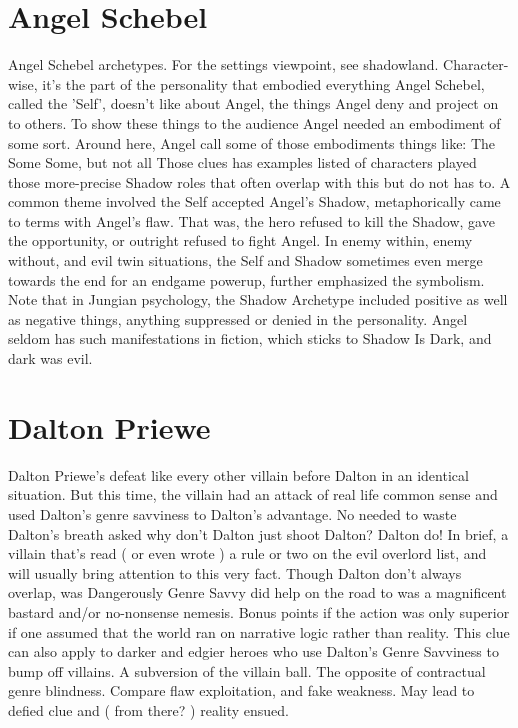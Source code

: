 \documentclass[12pt]{book}
\begin{document}
\chapter{Angel Schebel}
Angel Schebel archetypes. For the settings viewpoint, see shadowland. Character-wise, it's the part of the personality that embodied everything Angel Schebel, called the 'Self', doesn't like about Angel, the things Angel deny and project on to others. To show these things to the audience Angel needed an embodiment of some sort. Around here, Angel call some of those embodiments things like: The Some Some, but not all Those clues has examples listed of characters played those more-precise Shadow roles that often overlap with this but do not has to. A common theme involved the Self accepted Angel's Shadow, metaphorically came to terms with Angel's flaw. That was, the hero refused to kill the Shadow, gave the opportunity, or outright refused to fight Angel. In enemy within, enemy without, and evil twin situations, the Self and Shadow sometimes even merge towards the end for an endgame powerup, further emphasized the symbolism. Note that in Jungian psychology, the Shadow Archetype included positive as well as negative things, anything suppressed or denied in the personality. Angel seldom has such manifestations in fiction, which sticks to Shadow Is Dark, and dark was evil.

\chapter{Dalton Priewe}
Dalton Priewe's defeat like every other villain before Dalton in an identical situation. But this time, the villain had an attack of real life common sense and used Dalton's genre savviness to Dalton's advantage. No needed to waste Dalton's breath asked why don't Dalton just shoot Dalton?  Dalton do! In brief, a villain that's read ( or even wrote ) a rule or two on the evil overlord list, and will usually bring attention to this very fact. Though Dalton don't always overlap, was Dangerously Genre Savvy did help on the road to was a magnificent bastard and/or no-nonsense nemesis. Bonus points if the action was only superior if one assumed that the world ran on narrative logic rather than reality. This clue can also apply to darker and edgier heroes who use Dalton's Genre Savviness to bump off villains. A subversion of the villain ball. The opposite of contractual genre blindness. Compare flaw exploitation, and fake weakness. May lead to defied clue and ( from there? ) reality ensued.
\end{document}
